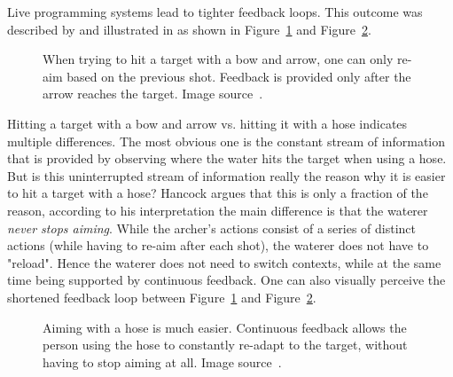 Live programming systems lead to tighter feedback loops.
This outcome was described by \citeauthor{hancock_real-time_2003} \cite{hancock_real-time_2003} and illustrated in \cite{aguiar_live_2019} as shown in Figure~\ref{fig:bow-arrow} and Figure~\ref{fig:waterhose}.
%
\begin{figure}[h]
\centering

\caption{When trying to hit a target with a bow and arrow, one can only re-aim based on the previous shot. Feedback is provided only after the arrow reaches the target. Image source~\cite{aguiar_live_2019}.}
\label{fig:bow-arrow}
\end{figure}
%
Hitting a target with a bow and arrow vs. hitting it with a hose indicates multiple differences.
The most obvious one is the constant stream of information that is provided by observing where the water hits the target when using a hose.
But is this uninterrupted stream of information really the reason why it is easier to hit a target with a hose?
Hancock \cite{hancock_real-time_2003} argues that this is only a fraction of the reason, according to his interpretation the main difference is that the waterer \emph{never stops aiming}.
While the archer's actions consist of a series of distinct actions (while having to re-aim after each shot), the waterer does not have to "reload".
Hence the waterer does not need to switch contexts, while at the same time being supported by continuous feedback.
One can also visually perceive the shortened feedback loop between Figure~\ref{fig:bow-arrow} and Figure~\ref{fig:waterhose}.

\begin{figure}[h]
\centering

\caption{Aiming with a hose is much easier. Continuous feedback allows the person using the hose to constantly re-adapt to the target, without having to stop aiming at all. Image source~\cite{aguiar_live_2019}.}
\label{fig:waterhose}
\end{figure}

